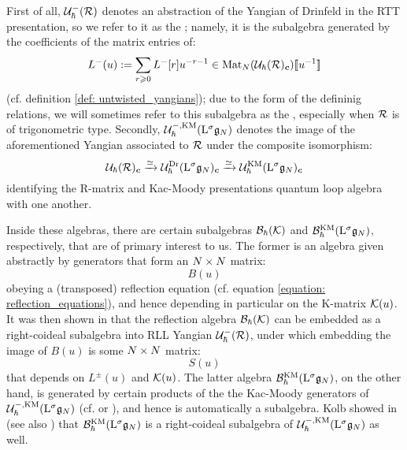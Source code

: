         First of all, $\mathcal{U}_{\hbar}^-(\mathcal{R})$ denotes an abstraction of the Yangian of Drinfeld in the RTT presentation, so we refer to it as the ; namely, it is the subalgebra generated by the coefficients of the matrix entries of:
            $$L^-(u) := \sum_{r \geqslant 0} L^-[r] u^{-r - 1} \in \operatorname{Mat}_N( \mathcal{U}_{\hbar}(\mathcal{R})_{\boldsymbol{c}} )[\![u^{-1}]\!]$$
        (cf. definition \ref{def: untwisted_yangians}); due to the form of the defininig relations, we will sometimes refer to this subalgebra as the , especially when $\mathcal{R}$ is of trigonometric type. Secondly, $\mathcal{U}_{\hbar}^{-, \mathrm{KM}}(\mathrm{L}^{\sigma} \mathfrak{g}_N)$ denotes the image of the aforementioned Yangian associated to $\mathcal{R}$ under the composite isomorphism:
            $$\mathcal{U}_{\hbar}(\mathcal{R})_{\boldsymbol{c}} \xrightarrow[]{\simeq} \mathcal{U}_{\hbar}^{\mathrm{Dr}}(\mathrm{L}^{\sigma} \mathfrak{g}_N)_{\boldsymbol{c}} \xrightarrow[]{\simeq} \mathcal{U}_{\hbar}^{\mathrm{KM}}(\mathrm{L}^{\sigma} \mathfrak{g}_N)_{\boldsymbol{c}}$$
        identifying the R-matrix and Kac-Moody presentations quantum loop algebra with one another.
        
        Inside these algebras, there are certain subalgebras $\mathcal{B}_{\hbar}(\mathcal{K})$ and $\mathcal{B}_{\hbar}^{\mathrm{KM}}(\mathrm{L}^{\sigma} \mathfrak{g}_N)$, respectively, that are of primary interest to us. The former is an algebra given abstractly by generators that form an $N \x N$ matrix:
            $$B(u)$$
        obeying a (transposed) reflection equation (cf. equation \eqref{equation: reflection_equations}), and hence depending in particular on the K-matrix $\mathcal{K}(u)$. It was then shown in \cite[Subsection 10.2]{regelskis_vlaar_reflection_matrices_coideal_subalgebras} that the reflection algebra $\mathcal{B}_{\hbar}(\mathcal{K})$ can be embedded as a right-coideal subalgebra into RLL Yangian $\mathcal{U}_{\hbar}^-(\mathcal{R})$, under which embedding the image of $B(u)$ is some $N \x N$ matrix:
            $$S(u)$$
        that depends on $L^{\pm}(u)$ and $\mathcal{K}(u)$. The latter algebra $\mathcal{B}_{\hbar}^{\mathrm{KM}}(\mathrm{L}^{\sigma} \mathfrak{g}_N)$, on the other hand, is generated by certain products of the the Kac-Moody generators of $\mathcal{U}^{-, \mathrm{KM}}_{\hbar}(\mathrm{L}^{\sigma} \mathfrak{g}_N)$ (cf. \cite[Definition 5.1]{kolb_kac_moody_QSPs} or \cite[Definition 3.5]{regelskis_vlaar_reflection_matrices_coideal_subalgebras}), and hence is automatically a subalgebra. Kolb showed in \cite[Proposition 5.2]{kolb_kac_moody_QSPs} (see also \cite[Proposition 3.6]{regelskis_vlaar_reflection_matrices_coideal_subalgebras}) that $\mathcal{B}_{\hbar}^{\mathrm{KM}}(\mathrm{L}^{\sigma} \mathfrak{g}_N)$ is a right-coideal subalgebra of $\mathcal{U}^{-, \mathrm{KM}}_{\hbar}(\mathrm{L}^{\sigma} \mathfrak{g}_N)$ as well.
        
